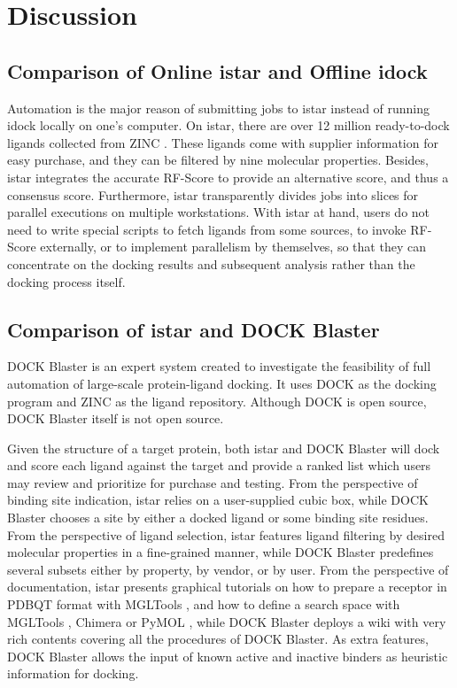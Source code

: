 \documentclass[10pt]{article}
\begin{document}
\section*{Discussion}

\subsection*{Comparison of Online istar and Offline idock}
Automation is the major reason of submitting jobs to istar instead of running idock locally on one's computer. On istar, there are over 12 million ready-to-dock ligands collected from ZINC \cite{532,1178}. These ligands come with supplier information for easy purchase, and they can be filtered by nine molecular properties. Besides, istar integrates the accurate RF-Score to provide an alternative score, and thus a consensus score. Furthermore, istar transparently divides jobs into slices for parallel executions on multiple workstations. With istar at hand, users do not need to write special scripts to fetch ligands from some sources, to invoke RF-Score externally, or to implement parallelism by themselves, so that they can concentrate on the docking results and subsequent analysis rather than the docking process itself.

\subsection*{Comparison of istar and DOCK Blaster}
DOCK Blaster \cite{557} is an expert system created to investigate the feasibility of full automation of large-scale protein-ligand docking. It uses DOCK \cite{1222} as the docking program and ZINC \cite{532,1178} as the ligand repository. Although DOCK is open source, DOCK Blaster itself is not open source.

Given the structure of a target protein, both istar and DOCK Blaster will dock and score each ligand against the target and provide a ranked list which users may review and prioritize for purchase and testing. From the perspective of binding site indication, istar relies on a user-supplied cubic box, while DOCK Blaster chooses a site by either a docked ligand or some binding site residues. From the perspective of ligand selection, istar features ligand filtering by desired molecular properties in a fine-grained manner, while DOCK Blaster predefines several subsets either by property, by vendor, or by user. From the perspective of documentation, istar presents graphical tutorials on how to prepare a receptor in PDBQT format with MGLTools \cite{596}, and how to define a search space with MGLTools \cite{596}, Chimera \cite{1219} or PyMOL \cite{1221}, while DOCK Blaster deploys a wiki with very rich contents covering all the procedures of DOCK Blaster. As extra features, DOCK Blaster allows the input of known active and inactive binders as heuristic information for docking.
\end{document}
